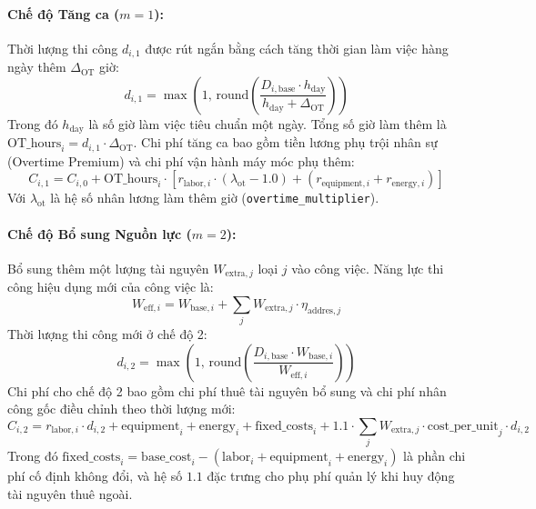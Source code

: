 \paragraph{Chế độ Tăng ca ($m=1$):}
Thời lượng thi công $d_{i, 1}$ được rút ngắn bằng cách tăng thời gian làm việc hàng ngày thêm $\Delta_{\text{OT}}$ giờ:
\begin{equation}
    d_{i, 1} = \max\left(1, \, \text{round}\left( \frac{D_{i, \text{base}} \cdot h_{\text{day}}}{h_{\text{day}} + \Delta_{\text{OT}}} \right)\right)
\end{equation}
Trong đó $h_{\text{day}}$ là số giờ làm việc tiêu chuẩn một ngày. Tổng số giờ làm thêm là $\text{OT\_hours}_i = d_{i, 1} \cdot \Delta_{\text{OT}}$. Chi phí tăng ca bao gồm tiền lương phụ trội nhân sự (Overtime Premium) và chi phí vận hành máy móc phụ thêm:
\begin{equation}
    C_{i, 1} = C_{i, 0} + \text{OT\_hours}_i \cdot \left[ r_{\text{labor}, i} \cdot (\lambda_{\text{ot}} - 1.0) + (r_{\text{equipment}, i} + r_{\text{energy}, i}) \right]
\end{equation}
Với $\lambda_{\text{ot}}$ là hệ số nhân lương làm thêm giờ (\texttt{overtime\_multiplier}).

\paragraph{Chế độ Bổ sung Nguồn lực ($m=2$):}
Bổ sung thêm một lượng tài nguyên $W_{\text{extra}, j}$ loại $j$ vào công việc. Năng lực thi công hiệu dụng mới của công việc là:
\begin{equation}
    W_{\text{eff}, i} = W_{\text{base}, i} + \sum_{j} W_{\text{extra}, j} \cdot \eta_{\text{addres}, j}
\end{equation}
Thời lượng thi công mới ở chế độ 2:
\begin{equation}
    d_{i, 2} = \max\left(1, \, \text{round}\left( \frac{D_{i, \text{base}} \cdot W_{\text{base}, i}}{W_{\text{eff}, i}} \right)\right)
\end{equation}
Chi phí cho chế độ 2 bao gồm chi phí thuê tài nguyên bổ sung và chi phí nhân công gốc điều chỉnh theo thời lượng mới:
\begin{equation}
    C_{i, 2} = r_{\text{labor}, i} \cdot d_{i, 2} + \text{equipment}_i + \text{energy}_i + \text{fixed\_costs}_i + 1.1 \cdot \sum_{j} W_{\text{extra}, j} \cdot \text{cost\_per\_unit}_j \cdot d_{i, 2}
\end{equation}
Trong đó $\text{fixed\_costs}_i = \text{base\_cost}_i - (\text{labor}_i + \text{equipment}_i + \text{energy}_i)$ là phần chi phí cố định không đổi, và hệ số $1.1$ đặc trưng cho phụ phí quản lý khi huy động tài nguyên thuê ngoài.

